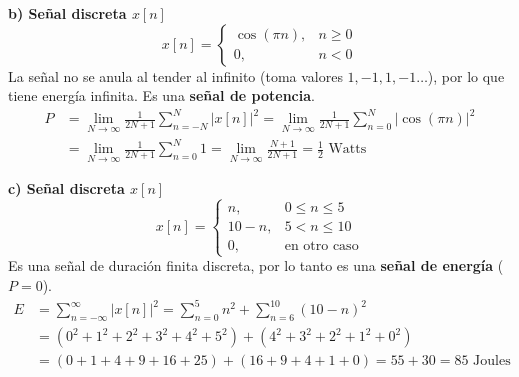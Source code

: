 \documentclass[12pt]{article}
\begin{document}
\textbf{b) Señal discreta $x[n]$}
\begin{equation*}
x[n] = \begin{cases} \cos(\pi n), & n \ge 0 \\ 0, & n < 0 \end{cases}
\end{equation*}
La señal no se anula al tender al infinito (toma valores $1, -1, 1, -1 \dots$), por lo que tiene energía infinita. Es una \textbf{señal de potencia}.
\begin{align*}
    P &= \lim_{N \to \infty} \frac{1}{2N+1} \sum_{n=-N}^{N} |x[n]|^2 = \lim_{N \to \infty} \frac{1}{2N+1} \sum_{n=0}^{N} |\cos(\pi n)|^2 \\
      &= \lim_{N \to \infty} \frac{1}{2N+1} \sum_{n=0}^{N} 1 = \lim_{N \to \infty} \frac{N+1}{2N+1} = \frac{1}{2} \text{ Watts}
\end{align*}

\textbf{c) Señal discreta $x[n]$}
\begin{equation*}
x[n] = \begin{cases} n, & 0 \le n \le 5 \\ 10-n, & 5 < n \le 10 \\ 0, & \text{en otro caso} \end{cases}
\end{equation*}
Es una señal de duración finita discreta, por lo tanto es una \textbf{señal de energía} ($P = 0$).
\begin{align*}
    E &= \sum_{n=-\infty}^{\infty} |x[n]|^2 = \sum_{n=0}^{5} n^2 + \sum_{n=6}^{10} (10-n)^2 \\
      &= (0^2 + 1^2 + 2^2 + 3^2 + 4^2 + 5^2) + (4^2 + 3^2 + 2^2 + 1^2 + 0^2) \\
      &= (0 + 1 + 4 + 9 + 16 + 25) + (16 + 9 + 4 + 1 + 0) = 55 + 30 = 85 \text{ Joules}
\end{align*}

\end{document}
